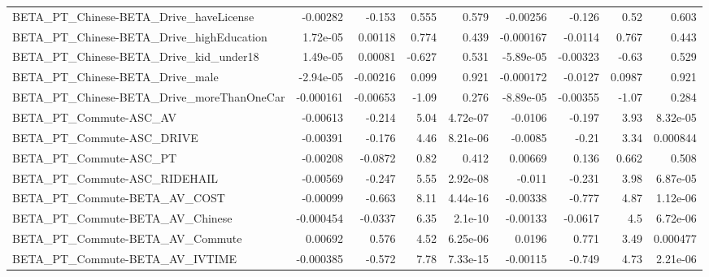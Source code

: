 \begin{tabular}{lrrrrrrrr}
BETA\_PT\_Chinese-BETA\_Drive\_haveLicense             &    -0.00282 &       -0.153 &    0.555 &    0.579 &   -0.00256 &      -0.126 &         0.52 &         0.603 \\
BETA\_PT\_Chinese-BETA\_Drive\_highEducation           &    1.72e-05 &      0.00118 &    0.774 &    0.439 &  -0.000167 &     -0.0114 &        0.767 &         0.443 \\
BETA\_PT\_Chinese-BETA\_Drive\_kid\_under18             &    1.49e-05 &      0.00081 &   -0.627 &    0.531 &  -5.89e-05 &    -0.00323 &        -0.63 &         0.529 \\
BETA\_PT\_Chinese-BETA\_Drive\_male                    &   -2.94e-05 &     -0.00216 &    0.099 &    0.921 &  -0.000172 &     -0.0127 &       0.0987 &         0.921 \\
BETA\_PT\_Chinese-BETA\_Drive\_moreThanOneCar          &   -0.000161 &     -0.00653 &    -1.09 &    0.276 &  -8.89e-05 &    -0.00355 &        -1.07 &         0.284 \\
BETA\_PT\_Commute-ASC\_AV                             &    -0.00613 &       -0.214 &     5.04 & 4.72e-07 &    -0.0106 &      -0.197 &         3.93 &      8.32e-05 \\
BETA\_PT\_Commute-ASC\_DRIVE                          &    -0.00391 &       -0.176 &     4.46 & 8.21e-06 &    -0.0085 &       -0.21 &         3.34 &      0.000844 \\
BETA\_PT\_Commute-ASC\_PT                             &    -0.00208 &      -0.0872 &     0.82 &    0.412 &    0.00669 &       0.136 &        0.662 &         0.508 \\
BETA\_PT\_Commute-ASC\_RIDEHAIL                       &    -0.00569 &       -0.247 &     5.55 & 2.92e-08 &     -0.011 &      -0.231 &         3.98 &      6.87e-05 \\
BETA\_PT\_Commute-BETA\_AV\_COST                       &    -0.00099 &       -0.663 &     8.11 & 4.44e-16 &   -0.00338 &      -0.777 &         4.87 &      1.12e-06 \\
BETA\_PT\_Commute-BETA\_AV\_Chinese                    &   -0.000454 &      -0.0337 &     6.35 &  2.1e-10 &   -0.00133 &     -0.0617 &          4.5 &      6.72e-06 \\
BETA\_PT\_Commute-BETA\_AV\_Commute                    &     0.00692 &        0.576 &     4.52 & 6.25e-06 &     0.0196 &       0.771 &         3.49 &      0.000477 \\
BETA\_PT\_Commute-BETA\_AV\_IVTIME                     &   -0.000385 &       -0.572 &     7.78 & 7.33e-15 &   -0.00115 &      -0.749 &         4.73 &      2.21e-06 \\

\end{tabular}
